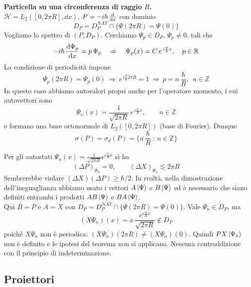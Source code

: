 \begin{example}
    \textbf{Particella su una circonferenza di raggio \(R\).}\\
    \(\mathcal{H}= L_2([0,2\pi R],\dd{x})\), \(P= -i\hbar\,\dv{x}\) con dominio
    \[
        D_P= D_P^{NAT} \cap \big\{ \Psi(2\pi R)= \Psi(0) \big\}
    \]
    Vogliamo lo spettro di \((P,D_P)\). Cerchiamo \(\Psi_p\in D_P\), \(\Psi_p\neq 0\), tali che
    \[
        -i\hbar\,\dv{\Psi_p}{x}= p\,\Psi_p \quad \Rightarrow \quad \Psi_p(x)= C\, e^{\,i\frac{p}{\hbar}x},\quad p\in \mathbb{R}
    \]
    La condizione di periodicità impone
    \[
        \Psi_p(2\pi R)= \Psi_p(0) \ \Rightarrow\ e^{\,i\frac{p}{\hbar}2\pi R}=1
        \ \Rightarrow\ p= n\,\frac{\hbar}{R},\ \ n\in \mathbb{Z}
    \]
    In questo caso abbiamo autovalori propri anche per l'operatore momento, i cui autovettori sono
    \[
        \Psi_n(x)= \frac{1}{\sqrt{2\pi R}}\, e^{\,i\frac{n}{R}x},\qquad n\in \mathbb{Z}
    \]
    e formano una base ortonormale di \(L_2([0,2\pi R])\) (base di Fourier). Dunque
    \[
        \sigma(P)= \sigma_d(P)= \Big\{ n\,\frac{\hbar}{R}\ :\ n\in \mathbb{Z} \Big\}
    \]
    
    \begin{attention}
        Per gli autostati \(\Psi_n(x)= \frac{1}{\sqrt{2\pi R}} e^{i\frac{n}{R}x}\) si ha
    \[
        (\Delta P)_{\Psi_n}=0, \qquad (\Delta X)_{\Psi_n} \lesssim 2\pi R
    \]
    Sembrerebbe violare \((\Delta X)(\Delta P)\ge \hbar/2\). In realtà, nella dimostrazione dell'ineguaglianza abbiamo usato i vettori
    \(A\ket{\Psi}\) e \(B\ket{\Psi}\) ed è necessario che siano definiti entrambi i prodotti \(AB\ket{\Psi}\) e \(BA\ket{\Psi}\).\\
    Qui \(B=P\) e \(A=X\) con \(D_P= D_P^{NAT}\cap\{\Psi(2\pi R)=\Psi(0)\}\). Vale \(\Psi_n\in D_P\), ma
    \[
        (X\Psi_n)(x)= x\,\frac{e^{i\frac{n}{R}x}}{\sqrt{2\pi R}} \notin D_P
    \]
    poiché \(X\Psi_n\) non è periodica: \((X\Psi_n)(2\pi R)\neq (X\Psi_n)(0)\). Quindi \(PX\ket{\Psi_n}\) non è definito e le ipotesi del teorema non si applicano.
    Nessuna contraddizione con il principio di indeterminazione.
    \end{attention}
    
\end{example}



\subsection{Proiettori}

